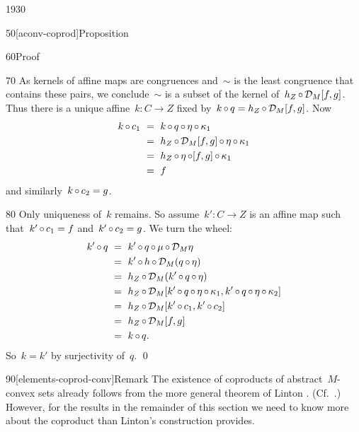 \begin{parsec}{1930}
\begin{point}{50}[aconv-coprod]{Proposition}
\begin{point}{60}{Proof}
\begin{point}{70}
As kernels of affine maps are congruences
    and~$\sim$ is the least congruence that contains these pairs,
    we conclude~$\sim$ is a subset of the kernel
    of~$h_Z \mathop{\circ} \mathcal{D}_M [f,g]$.
Thus there is a unique affine~$k\colon C \to Z$
    fixed by~$k \mathop{\circ} q = h_Z \mathop{\circ} \mathcal{D}_M [f,g]$.
Now
\begin{align*}
    k \mathop{\circ} c_1 
    &\ = \ k \mathop{\circ} q \mathop{\circ} \eta \mathop{\circ} \kappa_1 \\
    &\ = \ h_Z \mathop{\circ} \mathcal{D}_M [f,g]
                            \mathop{\circ} \eta\mathop{\circ} \kappa_1 \\
    &\ = \ h_Z \mathop{\circ} \eta \mathop{\circ}  [f,g]
                            \mathop{\circ} \kappa_1 \\
    &\ = \  f
\end{align*}
and similarly~$k \mathop{\circ} c_2 = g$.
\end{point}
\begin{point}{80}%
Only uniqueness of~$k$ remains.
So assume~$k'\colon C \to Z$ is an affine map
    such that~$k' \mathop{\circ} c_1 = f$
    and~$k' \mathop{\circ} c_2 = g$.
We turn the wheel:
\begin{align*}
    k' \mathop{\circ} q
    & \ = \ k' \mathop{\circ} q \mathop{\circ} \mu \mathop{\circ} \mathcal{D}_M \eta \\
    & \ = \ k' \mathop{\circ} h \mathop{\circ} \mathcal{D}_M (q \mathop{\circ} \eta) \\
    & \ = \ h_Z \mathop{\circ} \mathcal{D}_M (k' \mathop{\circ} q \mathop{\circ} \eta) \\
    & \ = \ h_Z \mathop{\circ} \mathcal{D}_M 
    [ k' \mathop{\circ} q \mathop{\circ} \eta \mathop{\circ} \kappa_1,
    k' \mathop{\circ} q \mathop{\circ} \eta \mathop{\circ} \kappa_2]  \\
    & \ = \ h_Z \mathop{\circ} \mathcal{D}_M 
    [ k' \mathop{\circ} c_1,
    k' \mathop{\circ} c_2]  \\
    & \ = \ h_Z \mathop{\circ} \mathcal{D}_M [ f, g] \\
    & \ = \ k \mathop{\circ} q.
\end{align*}
So~$k = k'$ by surjectivity of~$q$. \qed
\end{point}
\end{point}
\begin{point}{90}[elements-coprod-conv]{Remark}%
The existence of coproducts of abstract~$M$-convex sets already
    follows from the more general theorem of Linton \cite{linton}.
    (Cf.~\cite{barr}.)
However, for the results in the remainder of this section we need to know
    more about the coproduct than Linton's construction provides.


\end{point}
\end{point}
\end{parsec}
